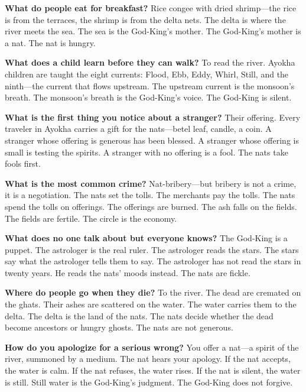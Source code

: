 \vspace{1em}

\begin{almanac}
\textbf{What do people eat for breakfast?} Rice congee with dried shrimp---the rice is from the terraces, the shrimp is from the delta nets. The delta is where the river meets the sea. The sea is the God-King's mother. The God-King's mother is a nat. The nat is hungry.

\textbf{What does a child learn before they can walk?} To read the river. Ayokha children are taught the eight currents: Flood, Ebb, Eddy, Whirl, Still, and the ninth---the current that flows upstream. The upstream current is the monsoon's breath. The monsoon's breath is the God-King's voice. The God-King is silent.

\textbf{What is the first thing you notice about a stranger?} Their offering. Every traveler in Ayokha carries a gift for the nats---betel leaf, candle, a coin. A stranger whose offering is generous has been blessed. A stranger whose offering is small is testing the spirits. A stranger with no offering is a fool. The nats take fools first.

\textbf{What is the most common crime?} Nat-bribery---but bribery is not a crime, it is a negotiation. The nats set the tolls. The merchants pay the tolls. The nats spend the tolls on offerings. The offerings are burned. The ash falls on the fields. The fields are fertile. The circle is the economy.

\textbf{What does no one talk about but everyone knows?} The God-King is a puppet. The astrologer is the real ruler. The astrologer reads the stars. The stars say what the astrologer tells them to say. The astrologer has not read the stars in twenty years. He reads the nats' moods instead. The nats are fickle.

\textbf{Where do people go when they die?} To the river. The dead are cremated on the ghats. Their ashes are scattered on the water. The water carries them to the delta. The delta is the land of the nats. The nats decide whether the dead become ancestors or hungry ghosts. The nats are not generous.

\textbf{How do you apologize for a serious wrong?} You offer a nat---a spirit of the river, summoned by a medium. The nat hears your apology. If the nat accepts, the water is calm. If the nat refuses, the water rises. If the nat is silent, the water is still. Still water is the God-King's judgment. The God-King does not forgive.


\end{almanac}
